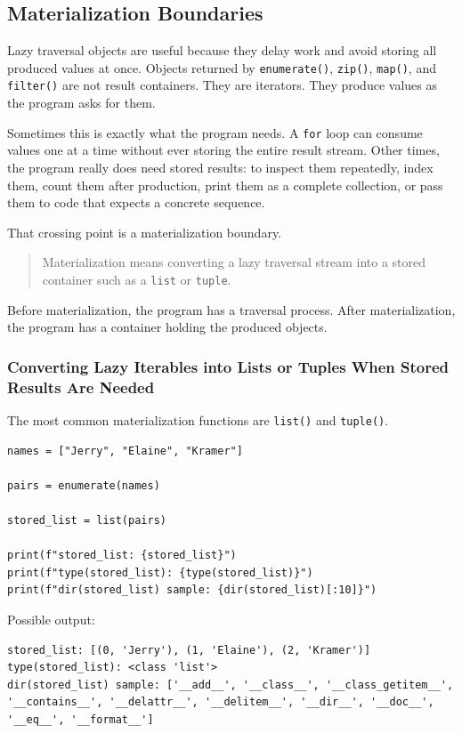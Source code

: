 \subsection{Materialization Boundaries}

Lazy traversal objects are useful because they delay work and avoid storing all produced values at once. Objects returned by \texttt{enumerate()}, \texttt{zip()}, \texttt{map()}, and \texttt{filter()} are not result containers. They are iterators. They produce values as the program asks for them.

Sometimes this is exactly what the program needs. A \texttt{for} loop can consume values one at a time without ever storing the entire result stream. Other times, the program really does need stored results: to inspect them repeatedly, index them, count them after production, print them as a complete collection, or pass them to code that expects a concrete sequence.

That crossing point is a materialization boundary.

\begin{quote}
Materialization means converting a lazy traversal stream into a stored container such as a \texttt{list} or \texttt{tuple}.
\end{quote}

Before materialization, the program has a traversal process. After materialization, the program has a container holding the produced objects.

\subsubsection{Converting Lazy Iterables into Lists or Tuples When Stored Results Are Needed}

The most common materialization functions are \texttt{list()} and \texttt{tuple()}.

\begin{verbatim}
names = ["Jerry", "Elaine", "Kramer"]

pairs = enumerate(names)

stored_list = list(pairs)

print(f"stored_list: {stored_list}")
print(f"type(stored_list): {type(stored_list)}")
print(f"dir(stored_list) sample: {dir(stored_list)[:10]}")
\end{verbatim}

Possible output:

\begin{verbatim}
stored_list: [(0, 'Jerry'), (1, 'Elaine'), (2, 'Kramer')]
type(stored_list): <class 'list'>
dir(stored_list) sample: ['__add__', '__class__', '__class_getitem__',
'__contains__', '__delattr__', '__delitem__', '__dir__', '__doc__',
'__eq__', '__format__']
\end{verbatim}

